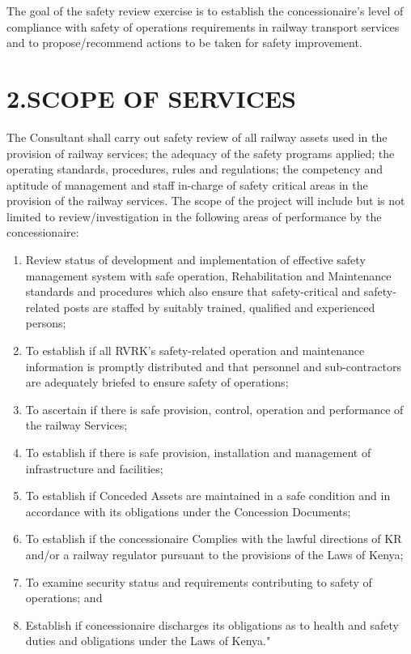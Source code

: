 The goal of the safety review exercise is to establish the
concessionaire's level of compliance with safety of operations
requirements in railway transport services and to propose/recommend
actions to be taken for safety improvement.

\section{2.SCOPE OF SERVICES}\label{scope-of-services}

The Consultant shall carry out safety review of all railway assets used
in the provision of railway services; the adequacy of the safety
programs applied; the operating standards, procedures, rules and
regulations; the competency and aptitude of management and staff
in-charge of safety critical areas in the provision of the railway
services. The scope of the project will include but is not limited to
review/investigation in the following areas of performance by the
concessionaire:

\begin{enumerate}

	\item  	Review status of development and implementation of effective safety
	management system with safe operation, Rehabilitation and Maintenance
	standards and procedures which also ensure that safety-critical and
	safety-related posts are staffed by suitably trained, qualified and
	experienced persons;
	\item 	To establish if all RVRK's safety-related operation and maintenance
	information is promptly distributed and that personnel and
	sub-contractors are adequately briefed to ensure safety of operations;
	\item 	To ascertain if there is safe provision, control, operation and
	performance of the railway Services;
	\item 	To establish if there is safe provision, installation and management
	of infrastructure and facilities;
	\item 	To establish if Conceded Assets are maintained in a safe condition and
	in accordance with its obligations under the Concession Documents;
	\item 	To establish if the concessionaire Complies with the lawful directions
	of KR and/or a railway regulator pursuant to the provisions of the
	Laws of Kenya;
	\item 	To examine security status and requirements contributing to safety of
	operations; and
	\item 	Establish if concessionaire discharges its obligations as to health
	and safety duties and obligations under the Laws of Kenya."
\end{enumerate}

